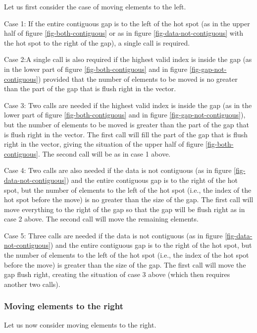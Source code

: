 \documentclass[11pt]{article}
\begin{document}
Let us first consider the case of moving elements to the left. 

Case 1: If the entire contiguous gap is to the left of the hot spot
(as in the upper half of figure \ref{fig-both-contiguous} or as in
figure \ref{fig-data-not-contiguous} with the hot spot to the right of
the gap), a single call is required.

Case 2:A single call is also required if the highest valid index is
inside the gap (as in the lower part of figure
\ref{fig-both-contiguous} and in figure \ref{fig-gap-not-contiguous})
provided that the number of elements to be moved is no greater than
the part of the gap that is flush right in the vector.

Case 3: Two calls are needed if the highest valid index is inside the
gap (as in the lower part of figure \ref{fig-both-contiguous} and in
figure \ref{fig-gap-not-contiguous}), but the number of elements to be
moved is greater than the part of the gap that is flush right in the
vector.  The first call will fill the part of the gap that is flush
right in the vector, giving the situation of the upper half of figure
\ref{fig-both-contiguous}.  The second call will be as in case 1
above. 

Case 4: Two calls are also needed if the data is not contiguous (as in
figure \ref{fig-data-not-contiguous}) and the entire contiguous gap is
to the right of the hot spot, but the number of elements to the left
of the hot spot (i.e., the index of the hot spot before the move) is
no greater than the size of the gap.  The first call will move
everything to the right of the gap so that the gap will be flush right
as in case 2 above.  The second call will move the remaining
elements.  

Case 5: Three calls are needed  if the data is not contiguous (as in
figure \ref{fig-data-not-contiguous}) and the entire contiguous gap is
to the right of the hot spot, but the number of elements to the left
of the hot spot (i.e., the index of the hot spot before the move) is
greater than the size of the gap.  The first call will move the gap
flush right, creating the situation of case 3 above (which then
requires another two calls).

\subsubsection{Moving elements to the right}

Let us now consider moving elements to the right.
\end{document}
